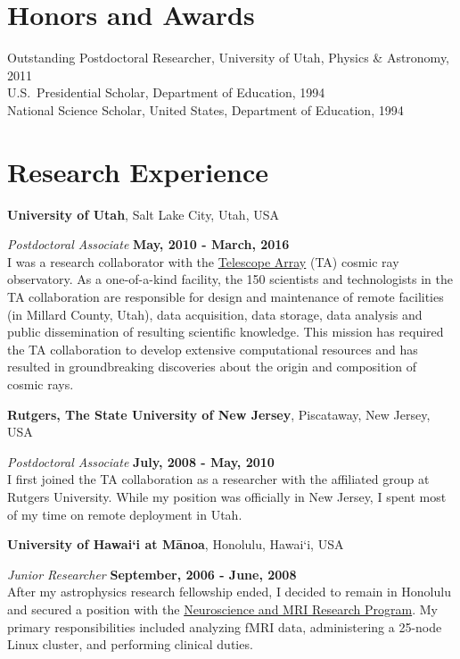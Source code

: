 \begin{resume}
\section{\sc Honors and Awards}
Outstanding Postdoctoral Researcher, University of Utah, Physics \& Astronomy, 2011\\
U.S.\ Presidential Scholar, Department of Education, 1994\\
National Science Scholar, United States, Department of Education, 1994\\

\section{\sc Research Experience}

{\bf University of Utah}, Salt Lake City, Utah, USA

\vspace{-.3cm}

{\em Postdoctoral Associate} \hfill {\bf May, 2010 - March, 2016}\\
I was a research collaborator with the
    \href{http://www.telescopearray.org}{Telescope Array} (TA)
    cosmic ray observatory. As a one-of-a-kind facility, the 150
    scientists and technologists in the TA collaboration are
    responsible for design and maintenance of remote facilities (in
    Millard County, Utah), data acquisition, data storage, data
    analysis and public dissemination of resulting scientific
    knowledge.  This mission has required the TA collaboration
    to develop extensive computational resources and has resulted in
    groundbreaking discoveries about the origin and composition of
    cosmic rays.

{\bf Rutgers, The State University of New Jersey}, Piscataway, New Jersey, USA

\vspace{-.3cm}

{\em Postdoctoral Associate} \hfill {\bf July, 2008 - May, 2010}\\
I first joined the TA collaboration as a researcher
    with the affiliated group at Rutgers University.  While my
    position was officially in New Jersey, I spent most of my time on
    remote deployment in Utah.

{\bf University of Hawai`i at M\={a}noa}, Honolulu, Hawai`i, USA

\vspace{-.3cm}
{\em Junior Researcher} \hfill {\bf September, 2006 - June, 2008}\\
After my astrophysics research fellowship ended, I decided
    to remain in Honolulu and secured a position with the
    \href{http://hawaii.edu/mri/home_v6.htm}{Neuroscience and
      MRI Research Program}.  My primary responsibilities
    included analyzing fMRI data, administering a 25-node Linux
    cluster, and performing clinical duties.


\end{resume}
